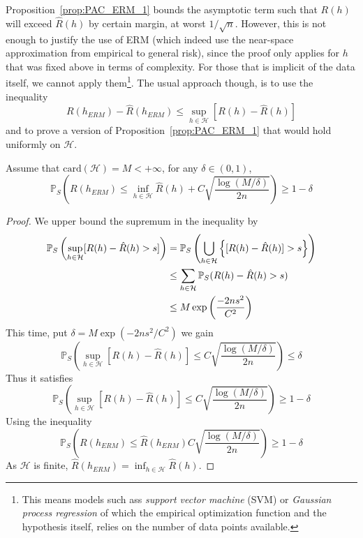 Proposition~\ref{prop:PAC_ERM_1} bounds the asymptotic term such that $R(h)$ will exceed $\hat{R}(h)$ by certain margin, at worst $1/\sqrt{n}$. However, this is not enough to justify the use of ERM (which indeed use the near-space approximation from empirical to general risk), since the proof only applies for $h$ that was fixed above in terms of complexity. For those that is implicit of the data itself, we cannot apply them\footnote{This means models such ass \textit{support vector machine} (SVM) or \textit{Gaussian process regression} of which the empirical optimization function and the hypothesis itself, relies on the number of data points available.}. The usual approach though, is to use the inequality 
\begin{equation}
    R(h_{ERM}) - \hat{R}(h_{ERM}) \leq \sup_{h\in\mathcal{H}} \left[R(h)-\hat{R}(h)\right]
\end{equation}
and to prove a version of Proposition~\ref{prop:PAC_ERM_1} that would hold uniformly on $\mathcal{H}$. 
\begin{theorem}
    Assume that $\mathrm{card}(\mathcal{H})=M<+\infty$, for any $\delta\in(0,1)$, 
    \begin{equation}
        \mathbb{P}_{S}\left( R(h_{ERM}) \leq \inf_{h\in\mathcal{H}} \hat{R}(h) + C\sqrt{\frac{\log{(M/\delta)}}{2n}} \right) \geq 1 - \delta
    \end{equation}
\end{theorem}
\begin{proof}
    We upper bound the supremum in the inequality by 
    \begin{equation}
        \begin{split}
            {\mathbb{P}}_{S} \left(\sup_{h\in\mathcal{H}}[R(h)-\hat{R}(h)>s]\right)
            & = {\mathbb{P}}_{S} \left(\bigcup_{h\in\mathcal{H}} \left\{ [R(h)-\hat{R}(h)]>s \right\} \right)\\
            & \leq \sum_{h\in\mathcal{H}} \mathbb{P}_{S}(R(h)-\hat{R}(h)>s)\\
            & \leq M\exp{\left(\frac{-2ns^2}{C^2}\right)}
        \end{split}
    \end{equation}
    This time, put $\delta = M\exp{(-2ns^2/C^2)}$ we gain 
\begin{equation}
     \mathbb{P}_{S}\left( \sup_{h\in\mathcal{H}}[R(h)-\hat{R}(h)] \leq  C\sqrt{\frac{\log{(M/\delta)}}{2n}} \right) \leq \delta
\end{equation}
Thus it satisfies 
\begin{equation}
     \mathbb{P}_{S}\left( \sup_{h\in\mathcal{H}}[R(h)-\hat{R}(h)] \leq  C\sqrt{\frac{\log{(M/\delta)}}{2n}} \right) \geq 1-\delta
\end{equation}
Using the inequality
\begin{equation}
    \mathbb{P}_{S}\left( R(h_{ERM}) \leq \hat{R}(h_{ERM})  C\sqrt{\frac{\log{(M/\delta)}}{2n}} \right) \geq 1-\delta    
\end{equation}
As $\mathcal{H}$ is finite, $\hat{R}(h_{ERM})=\inf_{h\in\mathcal{H}}\hat{R}(h)$.
\end{proof}
